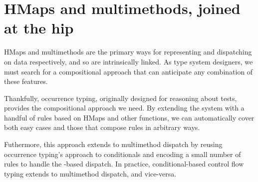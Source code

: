 %
%
%

\section{HMaps and multimethods, joined at the hip}

HMaps and multimethods are the primary ways for representing
and dispatching on data respectively, and so are intrinsically linked.
As type system designers, we must
search for a compositional approach that can anticipate
any combination of these features.

Thankfully, occurrence typing, originally designed for reasoning about
 tests, provides the compositional approach we need.
By extending the system with
a handful of rules based on HMaps and other functions, 
we can automatically cover both easy cases and those
that compose rules in arbitrary ways.

Futhermore, this approach extends to multimethod dispatch by reusing
occurrence typing's approach to conditionals
and
encoding a small number of rules to handle
the -based dispatch.
In practice, conditional-based control flow typing
extends to multimethod dispatch, and vice-versa.


